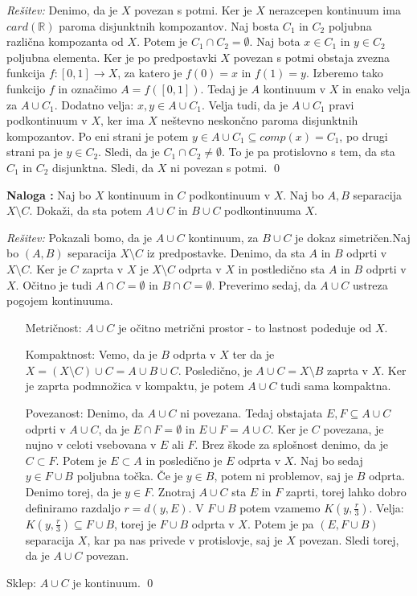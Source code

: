 \documentclass[a4paper, 10pt]{article}
\newcounter{nalogacount}
\newenvironment{naloga}{\begin{flushleft}\stepcounter{nalogacount}\textbf{Naloga \arabic{nalogacount}:}}{\hfill\end{flushleft}}
\newenvironment{Rešitev}{\begin{flushleft}\textit{Rešitev:}}{\hfill\qed\end{flushleft}}
\newcommand{\mth}[1]{\ensuremath{\mathbb{#1}}}
\newcommand{\R}{\mth{R}}
\newcommand{\map}[3]{\ensuremath{{#1}: {#2} \rightarrow {#3}}}
\begin{document}
	\begin{Rešitev}
		Denimo, da je $X$ povezan s potmi. Ker je $X$ nerazcepen kontinuum ima $card(\R)$ paroma disjunktnih kompozantov. Naj bosta $C_1$ in $C_2$ poljubna različna kompozanta od $X$. Potem je $C_1\cap C_2 = \emptyset$. Naj bota $x\in C_1$ in $y\in C_2$ poljubna elementa. Ker je po predpostavki $X$ povezan s potmi obstaja zvezna funkcija $\map{f}{[0, 1]}{X}$, za katero je $f(0) = x$ in $f(1) = y$. Izberemo tako funkcijo $f$ in označimo $A = f([0, 1])$. Tedaj je $A$ kontinuum v $X$ in enako velja za $A\cup C_1$. Dodatno velja: $x, y \in A\cup C_1$. Velja tudi, da je $A\cup C_1$ pravi podkontinuum v $X$, ker ima $X$ neštevno neskončno paroma disjunktnih kompozantov. Po eni strani je potem $y\in A\cup C_1 \subseteq comp(x) = C_1$, po drugi strani pa je $y\in C_2$. Sledi, da je $C_1\cap C_2 \neq \emptyset$. To je pa protislovno s tem, da sta $C_1$ in $C_2$ disjunktna. Sledi, da $X$ ni povezan s potmi.
	\end{Rešitev}
	
	\begin{naloga}
		Naj bo $X$ kontinuum in $C$ podkontinuum v $X$. Naj bo $A, B$ separacija $X\setminus C$. Dokaži, da sta potem $A\cup C$ in $B\cup C$ podkontinuuma $X$.
	\end{naloga}
	
	\begin{Rešitev}
		Pokazali bomo, da je $A\cup C$ kontinuum, za $B\cup C$ je dokaz simetričen.Naj bo $(A, B)$ separacija $X\setminus C$ iz predpostavke. Denimo, da sta $A$ in $B$ odprti v $X\setminus C$. Ker je $C$ zaprta v $X$ je $X\setminus C$ odprta v $X$ in postledično sta $A$ in $B$ odprti v $X$. Očitno je tudi $A\cap C = \emptyset$ in $B\cap C = \emptyset$. Preverimo sedaj, da $A\cup C$ ustreza pogojem kontinuuma.
		\begin{itemize}
			\item[Metričnost:] $A\cup C$ je očitno metrični prostor - to lastnost podeduje od $X$. 
			\item[Kompaktnost:] Vemo, da je $B$ odprta v $X$ ter da je $X = (X\setminus C) \cup C = A\cup B\cup C$. Posledično, je $A\cup C = X\setminus B$ zaprta v $X$. Ker je zaprta podmnožica v kompaktu, je potem $A\cup C$ tudi sama kompaktna.
			\item[Povezanost:] Denimo, da $A\cup C$ ni povezana. Tedaj obstajata $E, F\subseteq A\cup C$ odprti v $A\cup C$, da je $E\cap F = \emptyset$ in $E\cup F = A\cup C$. Ker je $C$ povezana, je nujno v celoti vsebovana v $E$ ali $F$. Brez škode za splošnost denimo, da je $C \subset F$. Potem je $E\subset A$ in posledično je $E$ odprta v $X$. Naj bo sedaj $y\in F\cup B$ poljubna točka. Če je $y\in B$, potem ni problemov, saj je $B$ odprta. Denimo torej, da je $y\in F$. Znotraj $A\cup C$ sta $E$ in $F$ zaprti, torej lahko dobro definiramo razdaljo $r = d(y, E)$. V $F\cup B$ potem vzamemo $K(y, \frac{r}{3})$. Velja: $K(y, \frac{r}{3}) \subseteq F\cup B$, torej je $F\cup B$ odprta v $X$. Potem je pa $(E, F\cup B)$ separacija $X$, kar pa nas privede v protislovje, saj je $X$ povezan. Sledi torej, da je $A\cup C$ povezan.
		\end{itemize}
		Sklep: $A\cup C$ je kontinuum.
	\end{Rešitev}
\end{document}
